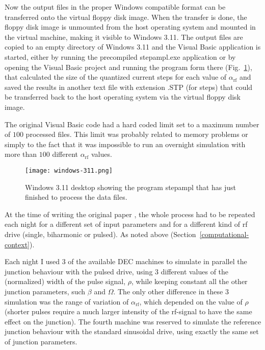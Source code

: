 Now the output files in the proper Windows compatible format can be transferred onto the virtual floppy disk image. %
When the transfer is done, the floppy disk image is unmounted from the host operating system and mounted  in the virtual machine, making it visible to Windows 3.11. 
The output files are copied to an empty directory of Windows 3.11 and the Visual Basic application is started, either by running the precompiled \textsf{stepampl.exe} application or by opening the Visual Basic project and running the program form there (Fig.~\ref{fig:stepampl}), that calculated the size of the quantized current steps for each value of $\alpha_\mathrm{rf}$ and saved the results in another text file with extension \textsf{.STP} (for steps) that could be transferred back to the host operating system via the virtual floppy disk image.

The original Visual Basic code had a hard coded limit set to a maximum number of $100$ processed files. This limit was probably related to memory problems or simply to the fact that it was impossible to run an overnight simulation with more than $100$ different $\alpha_\mathrm{rf}$ values.

\begin{figure}[tbh]
	\centering
	\texttt{[image: windows-311.png]}
	\caption{Windows 3.11 desktop showing the program \textsf{stepampl} that has just finished to process the data files.}
	\label{fig:stepampl}
\end{figure}


At the time of writing the original paper \cite{Maggi:1996}, the whole process had to be repeated each night for a different set of input parameters  and for a different kind of rf drive (single, biharmonic or pulsed). As noted above (Section~\ref{computational-context}). 

Each night I used $3$ of the available DEC machines to simulate in parallel the junction behaviour with the pulsed drive, using $3$ different values of the (normalized) width of the pulse signal, $\rho$, while keeping constant all the other junction parameters, such $\beta$ and $\Omega$.
The only other difference in these $3$ simulation was the range of variation of $\alpha_\mathrm{rf}$, which depended on the value of $\rho$ (shorter pulses require a much larger intensity of the rf-signal to have the same effect on the junction).
The fourth machine was reserved to simulate the reference junction behaviour with the standard sinusoidal drive, using exactly the same set of junction parameters.

